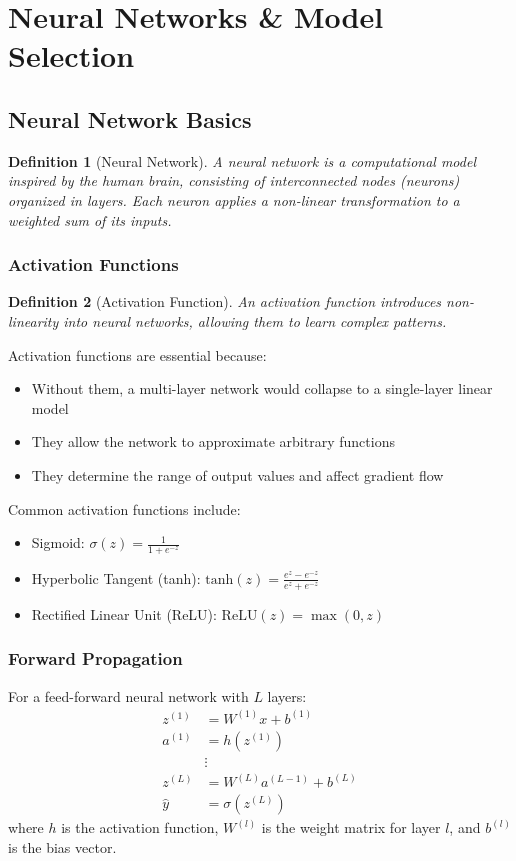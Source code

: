 \documentclass{article}
\newtheorem{definition}{Definition}
\begin{document}
\section{Neural Networks \& Model Selection}

\subsection{Neural Network Basics}
\begin{definition}[Neural Network]
A neural network is a computational model inspired by the human brain, consisting of interconnected nodes (neurons) organized in layers. Each neuron applies a non-linear transformation to a weighted sum of its inputs.
\end{definition}

\subsubsection{Activation Functions}
\begin{definition}[Activation Function]
An activation function introduces non-linearity into neural networks, allowing them to learn complex patterns.
\end{definition}

Activation functions are essential because:
\begin{itemize}
\item Without them, a multi-layer network would collapse to a single-layer linear model
\item They allow the network to approximate arbitrary functions
\item They determine the range of output values and affect gradient flow
\end{itemize}

Common activation functions include:
\begin{itemize}
\item Sigmoid: $\sigma(z) = \frac{1}{1+e^{-z}}$
\item Hyperbolic Tangent (tanh): $\text{tanh}(z) = \frac{e^z - e^{-z}}{e^z + e^{-z}}$
\item Rectified Linear Unit (ReLU): $\text{ReLU}(z) = \max(0, z)$
\end{itemize}

\subsubsection{Forward Propagation}
For a feed-forward neural network with $L$ layers:
\begin{align}
z^{(1)} &= W^{(1)}x + b^{(1)}\\
a^{(1)} &= h(z^{(1)})\\
&\vdots\\
z^{(L)} &= W^{(L)}a^{(L-1)} + b^{(L)}\\
\hat{y} &= \sigma(z^{(L)})
\end{align}
where $h$ is the activation function, $W^{(l)}$ is the weight matrix for layer $l$, and $b^{(l)}$ is the bias vector.
\end{document}
